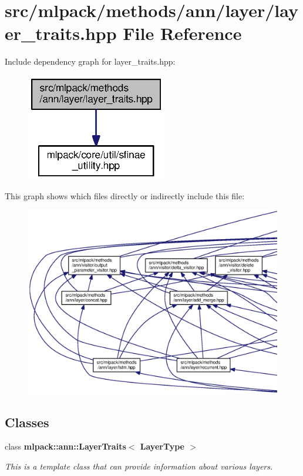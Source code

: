 \section{src/mlpack/methods/ann/layer/layer\+\_\+traits.hpp File Reference}
\label{layer__traits_8hpp}
Include dependency graph for layer\+\_\+traits.\+hpp\+:
\nopagebreak
\begin{figure}[H]
\begin{center}
\leavevmode
\includegraphics[width=173pt]{layer__traits_8hpp__incl}
\end{center}
\end{figure}
This graph shows which files directly or indirectly include this file\+:
\nopagebreak
\begin{figure}[H]
\begin{center}
\leavevmode
\includegraphics[width=350pt]{layer__traits_8hpp__dep__incl}
\end{center}
\end{figure}
\subsection*{Classes}
\begin{DoxyCompactItemize}
\item 
class {\bf mlpack\+::ann\+::\+Layer\+Traits$<$ Layer\+Type $>$}
\begin{DoxyCompactList}\small\item\em This is a template class that can provide information about various layers. \end{DoxyCompactList}\end{DoxyCompactItemize}
